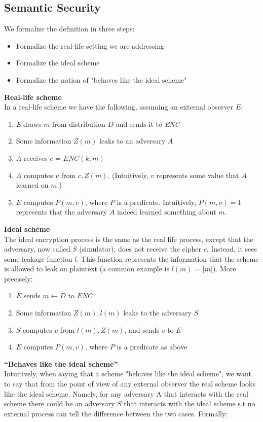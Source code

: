 \documentclass[12pt]{article}
\begin{document}
\subsection{Semantic Security}
We formalize the definition in three steps:
\begin{itemize}
\item Formalize the real-life setting we are addressing
\item Formalize the ideal scheme
\item Formalize the notion of "behaves like the ideal scheme"
\end{itemize}
\textbf{Real-life scheme}\\
In a real-life scheme we have the following, assuming an external observer $E$:
\begin{enumerate}
\item \textit{E} draws $m$ from distribution $D$ and sends it to \textit{ENC}
\item Some information $Z(m)$ leaks to an adversary $A$
\item $A$ receives $c$ = $ENC(k,m)$
\item $A$ computes $v$ from $c,Z(m)$. (Intuitively, $v$ represents some value that $A$ learned on $m$.)
\item $E$ computes $P(m, v)$, where $P$ is a predicate. Intuitively, $P(m, v) = 1$ represents that the adversary $A$ indeed learned something about $m$.
\end{enumerate}
\textbf{Ideal scheme}\\
The ideal encryption process is the same as the real life process, except that the adversary, now called $S$ (simulator), does not receive the cipher $c$. Instead, it sees some leakage function $l$. This function represents the information that the scheme is allowed to leak on plaintext (a common example is $l(m)$ = $|m|$). More precisely:
\begin{enumerate}
\item $E$ sends $m \leftarrow D$ to $ENC$
\item Some information $Z(m),l(m)$ leaks to the adversary $S$
\item $S$ computes $v$ from $l(m),Z(m)$, and sends $v$ to $E$
\item $E$ computes $P(m, v)$, where $P$ is a predicate as above
\end{enumerate}
\textbf{``Behaves like the ideal scheme''}\\
Intuitively, when saying that a scheme "behaves like the ideal scheme", we want to say that from the point of view of any external observer the real scheme looks like the ideal scheme. Namely, for any adversary A that interacts with the real scheme there could be an adversary $S$ that interacts with the ideal scheme s.t no external process can tell the difference between the two cases. Formally:
\end{document}
